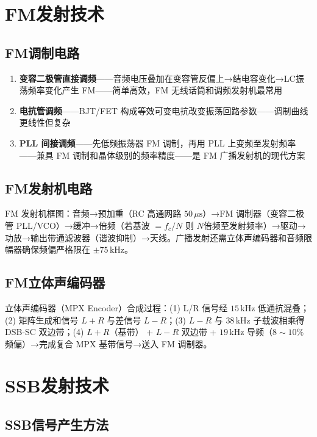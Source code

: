 \documentclass[12pt,UTF8]{ctexbook}
\begin{document}
\section{FM发射技术}
\label{sec:fm_tx}

\subsection{FM调制电路}


\begin{enumerate}
\item \textbf{变容二极管直接调频}——音频电压叠加在变容管反偏上→结电容变化→LC振荡频率变化产生 FM——简单高效，FM 无线话筒和调频发射机最常用
\item \textbf{电抗管调频}——BJT/FET 构成等效可变电抗改变振荡回路参数——调制曲线更线性但复杂
\item \textbf{PLL 间接调频}——先低频振荡器 FM 调制，再用 PLL 上变频至发射频率——兼具 FM 调制和晶体级别的频率精度——是 FM 广播发射机的现代方案
\end{enumerate}

\subsection{FM发射机电路}

FM 发射机框图：音频→预加重（RC 高通网路 $50\,\mu\mathrm{s}$）→FM 调制器（变容二极管 PLL/VCO）→缓冲→倍频（若基波 $=f_c/N$ 则 $N$倍频至发射频率）→驱动→功放→输出带通滤波器（谐波抑制）→天线。广播发射还需立体声编码器和音频限幅器确保频偏严格限在 $\pm75\,\mathrm{kHz}$。

\subsection{FM立体声编码器}

立体声编码器（MPX Encoder）合成过程：(1) L/R 信号经 $15\,\mathrm{kHz}$ 低通抗混叠；(2) 矩阵生成和信号 $L+R$ 与差信号 $L-R$；(3) $L-R$ 与 $38\,\mathrm{kHz}$ 子载波相乘得 DSB-SC 双边带；(4) $L+R$（基带） + $L-R$ 双边带 + $19\,\mathrm{kHz}$ 导频（$8\sim10\%$ 频偏）→完成复合 MPX 基带信号→送入 FM 调制器。

\section{SSB发射技术}
\label{sec:ssb_tx}

\subsection{SSB信号产生方法}
\end{document}
